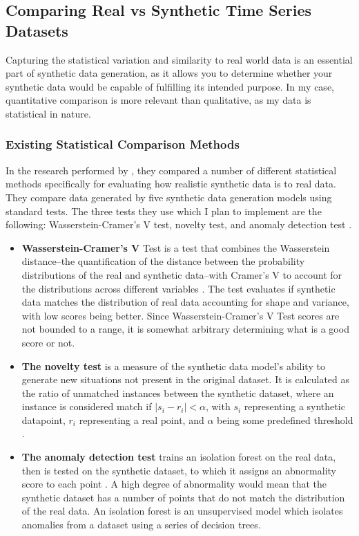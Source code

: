\documentclass[10pt,twocolumn]{article}
\begin{document}
\subsection{Comparing Real vs Synthetic Time Series Datasets}
Capturing the statistical variation and similarity to real world data is an essential part of synthetic data generation, as it allows you to determine whether your synthetic data would be capable of fulfilling its intended purpose. In my case, quantitative comparison is more relevant than qualitative, as my data is statistical in nature. 

\subsubsection{Existing Statistical Comparison Methods}
In the research performed by \textcite{livieris2024anevaluationframework}, they compared a number of different statistical methods specifically for evaluating how realistic synthetic data is to real data. They compare data generated by five synthetic data generation models using standard tests. The three tests they use which I plan to implement are the following: Wasserstein-Cramer's V test, novelty test, and anomaly detection test \cite{livieris2024anevaluationframework}. 

\begin{itemize}
    \item \textbf{Wasserstein-Cramer's V} Test is a test that combines the Wasserstein distance–the quantification of the distance between the probability distributions of the real and synthetic data–with Cramer’s V to account for the distributions across different variables \cite{livieris2024anevaluationframework}. The test evaluates if synthetic data matches the distribution of real data accounting for shape and variance, with low scores being better. Since Wasserstein-Cramer's V Test scores are not bounded to a range, it is somewhat arbitrary determining what is a good score or not. 
    \item \textbf{The novelty test} is a measure of the synthetic data model’s ability to generate new situations not present in the original dataset. It is calculated as the ratio of unmatched instances between the synthetic dataset, where an instance is considered match if $\left| s_i - r_i \right| < \alpha$,
    with $s_i$ representing a synthetic datapoint, $r_i$ representing a real point, and $\alpha$ being some predefined threshold \cite{livieris2024anevaluationframework}. 
    \item \textbf{The anomaly detection test} trains an isolation forest on the real data, then is tested on the synthetic dataset, to which it assigns an abnormality score to each point \cite{livieris2024anevaluationframework}. A high degree of abnormality would mean that the synthetic dataset has a number of points that do not match the distribution of the real data. An isolation forest is an unsupervised model which isolates anomalies from a dataset using a series of decision trees.
\end{itemize}
\end{document}
